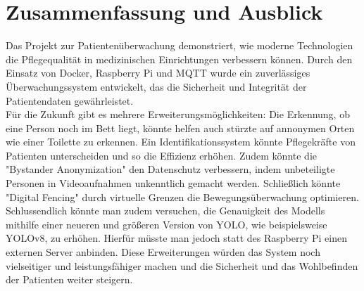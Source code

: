 \clearpage
\section{Zusammenfassung und Ausblick}
Das Projekt zur Patientenüberwachung demonstriert, wie moderne Technologien die Pflegequalität in medizinischen Einrichtungen verbessern können. Durch den Einsatz von Docker, Raspberry Pi und MQTT wurde ein zuverlässiges Überwachungssystem entwickelt, das die Sicherheit und Integrität der Patientendaten gewährleistet.\\

Für die Zukunft gibt es mehrere Erweiterungsmöglichkeiten: Die Erkennung, ob eine Person noch im Bett liegt, könnte helfen auch stürzte auf annonymen Orten wie einer Toilette zu erkennen. Ein Identifikationssystem könnte Pflegekräfte von Patienten unterscheiden und so die Effizienz erhöhen. Zudem könnte die "Bystander Anonymization" den Datenschutz verbessern, indem unbeteiligte Personen in Videoaufnahmen unkenntlich gemacht werden. Schließlich könnte "Digital Fencing" durch virtuelle Grenzen die Bewegungsüberwachung optimieren.\\

Schlussendlich könnte man zudem versuchen, die Genauigkeit des Modells mithilfe einer neueren und größeren Version von YOLO, wie beispielsweise YOLOv8, zu erhöhen. Hierfür müsste man jedoch statt des Raspberry Pi einen externen Server anbinden. Diese Erweiterungen würden das System noch vielseitiger und leistungsfähiger machen und die Sicherheit und das Wohlbefinden der Patienten weiter steigern.\\